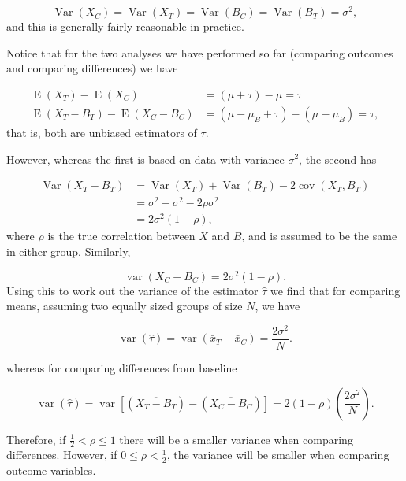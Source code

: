 \documentclass[
  openany]{book}
\theoremstyle{definition}
\theoremstyle{definition}
\theoremstyle{definition}
\theoremstyle{definition}
\theoremstyle{remark}
\begin{document}
\[\operatorname{Var}\left(X_C\right) = \operatorname{Var}\left(X_T\right) = \operatorname{Var}\left(B_C\right) = \operatorname{Var}\left(B_T\right) = \sigma^2,\]
and this is generally fairly reasonable in practice.

Notice that for the two analyses we have performed so far (comparing outcomes and comparing differences) we have

\[
\begin{aligned}
\operatorname{E}\left(X_T\right) - \operatorname{E}\left(X_C\right) & = \left(\mu + \tau\right) - \mu = \tau\\
\operatorname{E}\left(X_T - B_T\right) - \operatorname{E}\left(X_C - B_C\right) & = \left(\mu - \mu_B + \tau\right) - \left(\mu - \mu_B\right) = \tau,
\end{aligned}
\]
that is, both are unbiased estimators of \(\tau\).

However, whereas the first is based on data with variance \(\sigma^2\), the second has

\[
\begin{aligned}
\operatorname{Var}\left(X_T-B_T\right) & = \operatorname{Var}\left(X_T\right) + \operatorname{Var}\left(B_T\right) - 2\operatorname{cov}\left(X_T,B_T\right)\\
& = \sigma^2 + \sigma^2 - 2\rho\sigma^2 \\
& = 2\sigma^2\left(1-\rho\right),
\end{aligned}
\]
where \(\rho\) is the true correlation between \(X\) and \(B\), and is assumed to be the same in either group. Similarly,

\[\operatorname{var}\left(X_C-B_C\right) = 2\sigma^2\left(1-\rho\right).\]
Using this to work out the variance of the estimator \(\hat{\tau}\) we find that for comparing means, assuming two equally sized groups of size \(N\), we have

\[\operatorname{var}\left(\hat{\tau}\right) = \operatorname{var}\left(\bar{x}_T - \bar{x}_C\right) = \frac{2\sigma^2}{N}.\]

whereas for comparing differences from baseline

\[\operatorname{var}\left(\hat{\tau}\right) = \operatorname{var}\left[\left(\overline{X_T-B_T}\right) - \left(\overline{X_C - B_C}\right)\right] = 2\left(1-\rho\right)\left(\frac{2\sigma^2}{N}\right).\]

Therefore, if \(\frac{1}{2}<\rho\leq 1\) there will be a smaller variance when comparing differences. However, if \(0\leq\rho<\frac{1}{2}\), the variance will be smaller when comparing outcome variables.
\end{document}
